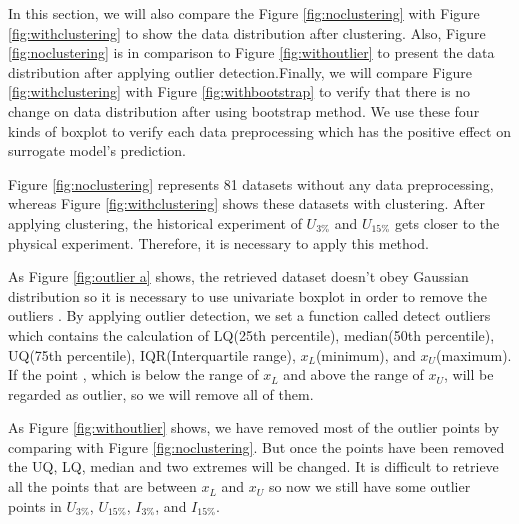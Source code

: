 In this section, we will also compare the Figure \ref{fig:noclustering} with Figure \ref{fig:withclustering} to show the data distribution after clustering. Also, Figure \ref{fig:noclustering} is in comparison to Figure \ref{fig:withoutlier} to present the data distribution after applying outlier detection.Finally, we will compare Figure \ref{fig:withclustering} with Figure \ref{fig:withbootstrap} to verify that there is no change on data distribution after using bootstrap method. We use these four kinds of boxplot to verify each data preprocessing which has the positive effect on surrogate model's prediction.

Figure \ref{fig:noclustering} represents 81 datasets without any data preprocessing, whereas Figure \ref{fig:withclustering} shows these datasets with clustering. After applying clustering, the historical experiment of $U_{3{\%}}$ and $U_{15{\%}}$ gets closer to the physical experiment. Therefore, it is necessary to apply this method. 

As Figure \ref{fig:outlier a} shows, the retrieved dataset doesn't obey Gaussian distribution so it is necessary to use univariate boxplot in order to remove the outliers \cite{shevlyakov2013robust}. By applying outlier detection, we set a function called detect outliers which contains the calculation of  LQ(25th percentile), median(50th percentile), UQ(75th percentile),
IQR(Interquartile range), $x_{L}$(minimum), and $x_{U}$(maximum). If the point , which is below the range of $x_{L}$ and above the range of $x_{U}$, will be regarded as outlier, so we will remove all of them.

As Figure \ref{fig:withoutlier} shows, we have removed most of the outlier points by comparing with Figure \ref{fig:noclustering}. But once the points have been removed the UQ, LQ, median and two extremes will be changed. It is difficult to retrieve all the points that are between $x_{L}$ and $x_{U}$ so now we still have some outlier points in $U_{3{\%}}$, $U_{15{\%}}$, $I_{3{\%}}$, and $I_{15{\%}}$.

